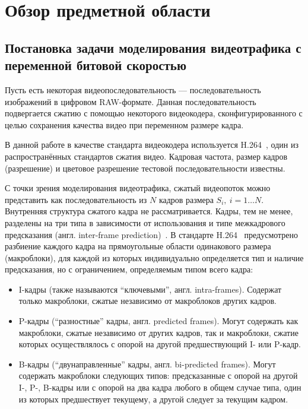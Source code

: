 \section{Обзор предметной области}
\label{sec:survey}
\subsection{Постановка задачи моделирования видеотрафика
с переменной битовой скоростью}

Пусть есть некоторая видеопоследовательность ---
последовательность изображений в цифровом RAW-формате.
Данная последовательность подвергается сжатию с помощью
некоторого видеокодера, сконфигурированного с целью
сохранения качества видео при переменном размере кадра.

В данной работе в качестве стандарта видеокодера
используется H.264~\cite{h264spec}, один из распространённых
стандартов сжатия видео. Кадровая частота, размер кадров (разрешение)
и цветовое разрешение тестовой последовательности известны.

С точки зрения моделирования видеотрафика, сжатый видеопоток
можно представить как последовательность из $N$ кадров
размера $S_i,~i=1\dots N$. Внутренняя структура сжатого
кадра не рассматривается. Кадры, тем не менее, разделены
на три типа в зависимости от использования и типе межкадрового
предсказания (англ. inter-frame prediction)~\cite{salomoncomp}.
В стандарте H.264~\cite{h264spec} предусмотрено разбиение каждого
кадра на прямоугольные области одинакового размера (макроблоки),
для каждой из которых индивидуально определяется тип и наличие
предсказания, но с ограничением, определяемым типом всего кадра:

\begin{itemize}
    \item I-кадры (также называются ``ключевыми'', англ. intra-frames).
        Содержат только макроблоки, сжатые независимо от макроблоков
        других кадров.
    \item P-кадры (``разностные'' кадры, англ. predicted frames).
        Могут содержать как макроблоки, сжатые независимо от других
        кадров, так и макроблоки, сжатие которых осуществлялось с
        опорой на другой предшествующий I- или P-кадр.
    \item B-кадры (``двунаправленные'' кадры, англ. bi-predicted frames).
        Могут содержать макроблоки следующих типов: предсказанные с опорой
        на другой I-, P-, B-кадры или с опорой на два кадра любого в
        общем случае типа, один из которых предшествует текущему,
        а другой следует за текущим кадром.
\end{itemize}

